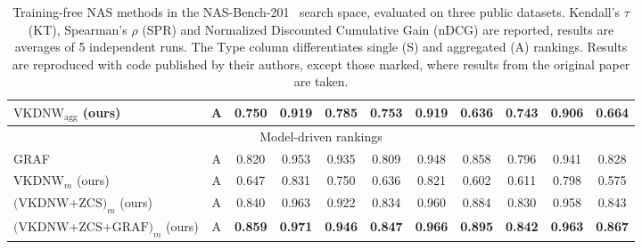 \begin{table*}[t]
\begin{tabular}{lc|ccc|ccc|ccc}
$\text{VKDNW}_{\text{agg}}$ (ours)& A  & \textbf{0.750} & \textbf{0.919} & \textbf{0.785} & \textbf{0.753} & \textbf{0.919} & \textbf{0.636} & \textbf{0.743} & \textbf{0.906} & \textbf{0.664} \\
 \hline
 \multicolumn{11}{c}{Model-driven rankings}\\
 \hline
GRAF \cite{kadlecova2024surprisingly} & A & 0.820 & 0.953 & 0.935 & 0.809 & 0.948 & 0.858 & 0.796 & 0.941 & 0.828 \\
$\text{VKDNW}_{m}$ (ours) & A & 0.647 & 0.831 & 0.750 & 0.636 & 0.821 & 0.602 & 0.611 & 0.798 & 0.575 \\
$\text{(VKDNW+ZCS)}_{m}$ (ours) & A & 0.840 & 0.963 & 0.922 & 0.834 & 0.960 & 0.884 & 0.830 & 0.958 & 0.843 \\
$\text{(VKDNW+ZCS+GRAF)}_{m}$ (ours) & A & \textbf{0.859} & \textbf{0.971} & \textbf{0.946} & \textbf{0.847} & \textbf{0.966} & \textbf{0.895} & \textbf{0.842} & \textbf{0.963} & \textbf{0.867}
\end{tabular}
\caption{Training-free NAS methods in the NAS-Bench-201~\cite{dong2020bench} search space, evaluated on three public datasets. Kendall's $\tau$ (KT), Spearman's $\rho$ (SPR) and Normalized Discounted Cumulative Gain ($\text{nDCG}$) are reported, results are averages of 5 independent runs. The Type column differentiates single (S) and aggregated (A) rankings. Results are reproduced with code published by their authors, except those marked\dag, where results from the original paper are taken. 
}
\label{tab:table1}
\end{table*}